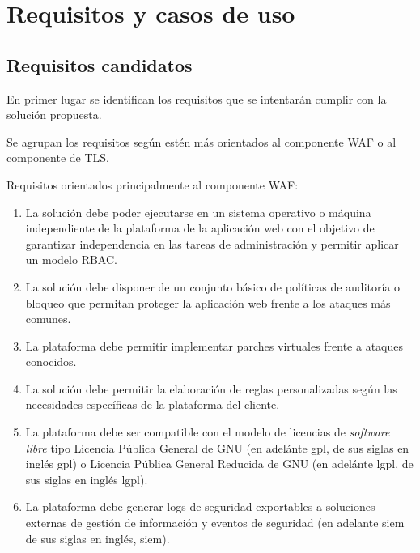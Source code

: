 \chapter{Requisitos y casos de uso}
\section{Requisitos candidatos}
\par En primer lugar se identifican los requisitos que se intentarán cumplir con la solución propuesta.
\par Se agrupan los requisitos según estén más orientados al componente WAF o al componente de TLS.
\par Requisitos orientados principalmente al componente WAF:
\begin{enumerate}[\bfseries{}R1. ]
  \item La solución debe poder ejecutarse en un sistema operativo o máquina independiente de la plataforma de la aplicación web con el
    objetivo de garantizar independencia en las tareas de administración y permitir aplicar un modelo RBAC.
  \item La solución debe disponer de un conjunto básico de políticas de auditoría o bloqueo que permitan proteger la aplicación web frente a
    los ataques más comunes.
  \item La plataforma debe permitir implementar parches virtuales frente a ataques conocidos.
  \item La solución debe permitir la elaboración de reglas personalizadas según las necesidades específicas de la plataforma del cliente.
  \item La plataforma debe ser compatible con el modelo de licencias de {\em software libre\cite{softwarelibre}} tipo
    Licencia Pública General de GNU (en adelánte \acrshort{gpl}, de  sus siglas en inglés \acrlong{gpl}) o Licencia Pública General Reducida
    de GNU (en adelánte \acrshort{lgpl}, de  sus siglas en inglés \acrlong{lgpl}).
  \item La plataforma debe generar logs de seguridad exportables a soluciones externas de gestión de información y eventos de seguridad (en
    adelante \acrshort{siem} de sus siglas en inglés, \acrlong{siem}).
\end{enumerate}

